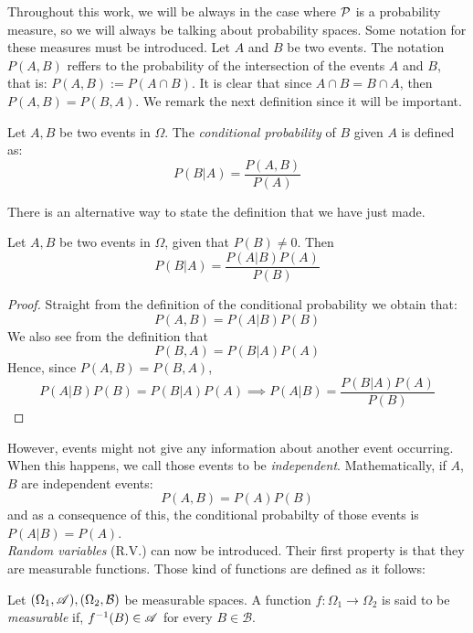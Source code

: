 Throughout this work, we will be always in the case where $\mathcal{P}$ is a probability measure, so we will always be talking about probability spaces. Some notation for these measures must be introduced. Let $A$ and $B$ be two events.
The notation $P(A,B)$ reffers to the probability of the intersection of the events $A$ and $B$, that is: $P(A,B) := P(A\cap B)$.
 It is clear that since $A \cap B = B \cap A$, then $P(A,B) = P(B,A)$. We remark the next definition since it will be important.

\begin{ndef}
Let $A,B$ be two events in $\Omega$. The \emph{conditional probability} of $B$ given $A$ is defined as:
$$
P(B|A) = \frac{P(A,B)}{P(A)}
$$
\end{ndef}




There is an alternative way to state the definition that we have just made.

\begin{nth}
Let $A,B$ be two events in $\Omega$, given that $P(B) \neq 0$. Then
$$
P(B|A) = \frac{P(A|B) P(A)}{P(B)}
$$
\end{nth}
\begin{proof}
Straight from the definition of the conditional probability we obtain that:
$$
P(A,B) = P(A|B)P(B)
$$
We also see from the definition that
$$
P(B,A) = P(B|A)P(A)
$$
Hence, since $P(A,B) = P(B,A)$,
$$
P(A|B)P(B) = P(B|A)P(A) \implies P(A|B) = \frac{P(B|A)P(A)}{P(B)}
$$
\end{proof}


However, events might not give any information about another event occurring. When this happens, we call those events to be \emph{independent}. Mathematically, if $A$,$B$ are independent events:
$$
P(A,B) = P(A)P(B)
$$
and as a consequence of this, the conditional probabilty of those events is $P(A|B) = P(A)$.\\


\emph{Random variables} (R.V.) can now be introduced. Their first property is that they are measurable functions. Those kind of functions are defined as it follows:

\begin{ndef}
Let $(\Omega_1, \mathscr{A}),(\Omega_2, \mathcal B)$ be measurable spaces. A function $f: \Omega_1 \to \Omega_2$ is said to be \emph{measurable} if, $f^{-1}(B) \in \mathscr{A}$ for every $B \in \mathcal B$.
\end{ndef}

